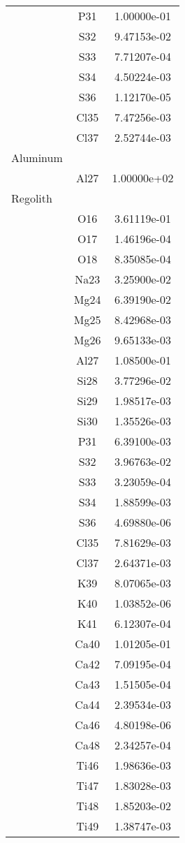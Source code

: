 \begin{centering}
\begin{longtable}{l c c}
& P31 & 1.00000e-01 \\ 
& S32 & 9.47153e-02 \\ 
& S33 & 7.71207e-04 \\ 
& S34 & 4.50224e-03 \\ 
& S36 & 1.12170e-05 \\ 
& Cl35 & 7.47256e-03 \\ 
& Cl37 & 2.52744e-03 \\ 
\hline
Aluminum & & \\
\hline
& Al27 & 1.00000e+02 \\ 
\hline
Regolith & & \\
\hline
& O16 & 3.61119e-01 \\ 
& O17 & 1.46196e-04 \\ 
& O18 & 8.35085e-04 \\ 
& Na23 & 3.25900e-02 \\ 
& Mg24 & 6.39190e-02 \\ 
& Mg25 & 8.42968e-03 \\ 
& Mg26 & 9.65133e-03 \\ 
& Al27 & 1.08500e-01 \\ 
& Si28 & 3.77296e-02 \\ 
& Si29 & 1.98517e-03 \\ 
& Si30 & 1.35526e-03 \\ 
& P31 & 6.39100e-03 \\ 
& S32 & 3.96763e-02 \\ 
& S33 & 3.23059e-04 \\ 
& S34 & 1.88599e-03 \\ 
& S36 & 4.69880e-06 \\ 
& Cl35 & 7.81629e-03 \\ 
& Cl37 & 2.64371e-03 \\ 
& K39 & 8.07065e-03 \\ 
& K40 & 1.03852e-06 \\ 
& K41 & 6.12307e-04 \\ 
& Ca40 & 1.01205e-01 \\ 
& Ca42 & 7.09195e-04 \\ 
& Ca43 & 1.51505e-04 \\ 
& Ca44 & 2.39534e-03 \\ 
& Ca46 & 4.80198e-06 \\ 
& Ca48 & 2.34257e-04 \\ 
& Ti46 & 1.98636e-03 \\ 
& Ti47 & 1.83028e-03 \\ 
& Ti48 & 1.85203e-02 \\ 
& Ti49 & 1.38747e-03 \\ 

\end{longtable}
\end{centering}
